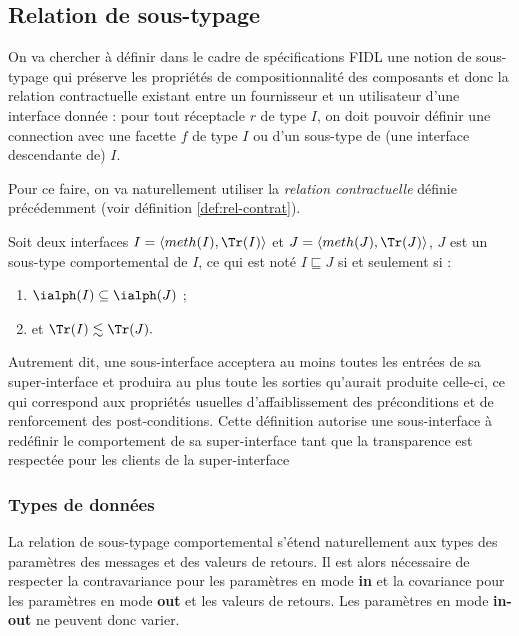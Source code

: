 \subsection{Relation de sous-typage}

On va chercher \`a d\'efinir dans le cadre de sp\'ecifications
\textsf{FIDL} une notion de sous-typage
qui pr\'eserve les propri\'et\'es de compositionnalit\'e des
composants et donc la relation contractuelle existant entre un
fournisseur et un utilisateur d'une interface donn\'ee : pour tout
r\'eceptacle $r$ de type $I$, on doit pouvoir d\'efinir une
connection avec une facette $f$ de type $I$ ou d'un sous-type de (une
interface descendante de) $I$.

Pour ce faire, on va naturellement utiliser la \emph{relation
  contractuelle}  d\'efinie pr\'ec\'edemment (voir d\'efinition
  \ref{def:rel-contrat}). 

\begin{definition}
Soit deux  interfaces $I=\langle meth(I),\Tr(I)\rangle$ et $J=\langle
meth(J),\Tr(J)\rangle$, 
$J$ est un sous-type comportemental de $I$, ce qui est not\'e $I
\sqsubseteq J$ si et seulement si :
\begin{enumerate}
  \item $\ialph(I)\subseteq \ialph(J)$ ;
  \item et $\Tr(I) \lesssim \Tr(J).$
\end{enumerate}
\end{definition} 

Autrement dit, une sous-interface acceptera au moins toutes les
entr\'ees de sa super-interface et produira au plus toute les sorties
qu'aurait produite celle-ci, ce qui correspond aux propri\'et\'es usuelles
d'affaiblissement des pr\'econditions et de renforcement des post-conditions. 
Cette d\'efinition autorise une sous-interface \`a
red\'efinir le comportement de sa super-interface tant que la
transparence est respect\'ee pour les clients de la super-interface

\subsubsection{Types de donn\'ees}

La relation de sous-typage comportemental s'\'etend
naturellement aux types des param\`etres des messages et des valeurs
de retours. Il est alors n\'ecessaire de respecter la contravariance pour
les param\`etres en mode \textbf{in} et la covariance pour les
param\`etres en mode \textbf{out} et les valeurs de retours. Les
param\`etres en mode \textbf{in-out} ne peuvent donc varier. 

